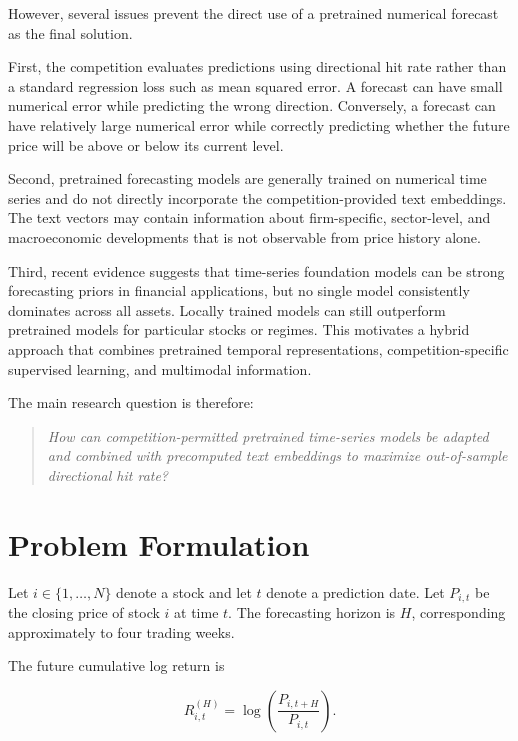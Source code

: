 \documentclass[11pt]{article}
\begin{document}
However, several issues prevent the direct use of a pretrained numerical
forecast as the final solution.

First, the competition evaluates predictions using directional hit rate rather
than a standard regression loss such as mean squared error. A forecast can have
small numerical error while predicting the wrong direction. Conversely, a
forecast can have relatively large numerical error while correctly predicting
whether the future price will be above or below its current level.

Second, pretrained forecasting models are generally trained on numerical time
series and do not directly incorporate the competition-provided text
embeddings. The text vectors may contain information about firm-specific,
sector-level, and macroeconomic developments that is not observable from price
history alone.

Third, recent evidence suggests that time-series foundation models can be
strong forecasting priors in financial applications, but no single model
consistently dominates across all assets. Locally trained models can still
outperform pretrained models for particular stocks or regimes. This motivates
a hybrid approach that combines pretrained temporal representations,
competition-specific supervised learning, and multimodal information.

The main research question is therefore:

\begin{quote}
\emph{How can competition-permitted pretrained time-series models be adapted
and combined with precomputed text embeddings to maximize out-of-sample
directional hit rate?}
\end{quote}

\section{Problem Formulation}

Let $i \in \{1,\ldots,N\}$ denote a stock and let $t$ denote a prediction date.
Let $P_{i,t}$ be the closing price of stock $i$ at time $t$. The forecasting
horizon is $H$, corresponding approximately to four trading weeks.

The future cumulative log return is

\begin{equation}
R_{i,t}^{(H)}
=
\log\left(
\frac{P_{i,t+H}}{P_{i,t}}
\right).
\end{equation}
\end{document}
